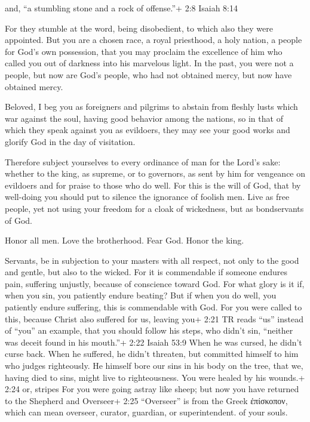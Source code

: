  and, ``a stumbling stone and a rock of offense.''+ 2:8
Isaiah 8:14

For they stumble at the word, being disobedient, to which also they were
appointed.  But you are a chosen race, a royal priesthood, a
holy nation, a people for God's own possession, that you may proclaim
the excellence of him who called you out of darkness into his marvelous
light.  In the past, you were not a people, but now are
God's people, who had not obtained mercy, but now have obtained mercy.

 Beloved, I beg you as foreigners and pilgrims to abstain
from fleshly lusts which war against the soul,  having good
behavior among the nations, so in that of which they speak against you
as evildoers, they may see your good works and glorify God in the day of
visitation.

 Therefore subject yourselves to every ordinance of man for
the Lord's sake: whether to the king, as supreme,  or to
governors, as sent by him for vengeance on evildoers and for praise to
those who do well.  For this is the will of God, that by
well-doing you should put to silence the ignorance of foolish men.
 Live as free people, yet not using your freedom for a
cloak of wickedness, but as bondservants of God.

 Honor all men. Love the brotherhood. Fear God. Honor the
king.

 Servants, be in subjection to your masters with all
respect, not only to the good and gentle, but also to the wicked.
 For it is commendable if someone endures pain, suffering
unjustly, because of conscience toward God.  For what glory
is it if, when you sin, you patiently endure beating? But if when you do
well, you patiently endure suffering, this is commendable with God.
 For you were called to this, because Christ also suffered
for us, leaving you+ 2:21 TR reads ``us'' instead of ``you'' an example,
that you should follow his steps,  who didn't sin,
``neither was deceit found in his mouth.''+ 2:22 Isaiah 53:9
 When he was cursed, he didn't curse back. When he
suffered, he didn't threaten, but committed himself to him who judges
righteously.  He himself bore our sins in his body on the
tree, that we, having died to sins, might live to righteousness. You
were healed by his wounds.+ 2:24 or, stripes  For you were
going astray like sheep; but now you have returned to the Shepherd and
Overseer+ 2:25 ``Overseer'' is from the Greek ἐπίσκοπον, which can mean
overseer, curator, guardian, or superintendent. of your souls.

